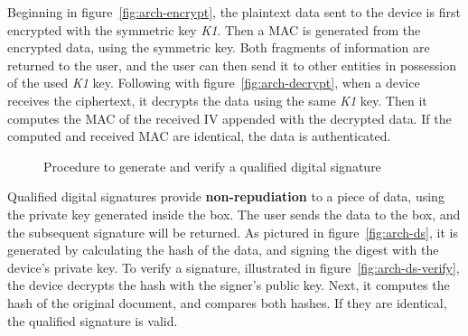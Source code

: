 Beginning in figure~\ref{fig:arch-encrypt}, the plaintext data sent to the device is first encrypted with the symmetric key \textit{K1}. Then a \ac{MAC} is generated from the encrypted data, using the symmetric key. Both fragments of information are returned to the user, and the user can then send it to other entities in possession of the used \textit{K1} key.
Following with figure~\ref{fig:arch-decrypt}, when a device receives the ciphertext, it decrypts the data using the same \textit{K1} key. Then it computes the MAC of the received \ac{IV} appended with the decrypted data. If the computed and received \ac{MAC} are identical, the data is authenticated.

\begin{figure}[h]
	\centering     %
	\caption{Procedure to generate and verify a qualified digital signature}
\end{figure}

Qualified digital signatures provide \textbf{non-repudiation} to a piece of data, using the private key generated inside the box. The user sends the data to the box, and the subsequent signature will be returned. As pictured in figure~\ref{fig:arch-ds}, it is generated by calculating the hash of the data, and signing the digest with the device's private key. To verify a signature, illustrated in figure~\ref{fig:arch-ds-verify}, the device decrypts the hash with the signer's public key. Next, it computes the hash of the original document, and compares both hashes. If they are identical, the qualified signature is valid.

